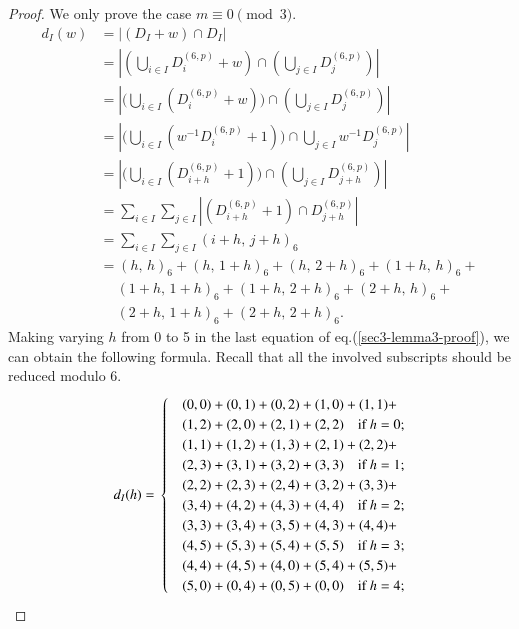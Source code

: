 \documentclass[letter]{ieice}
\begin{document}
 \begin{proof}
 We only prove the case $ m\equiv 0 \pmod 3 $.
 \begin{equation}\label{sec3-lemma3-proof}
 \begin{split}
  d_{I}(w)&=|( \mathit{D}_{I}+w)\cap  \mathit{D}_{I}|\\
   &=|(\bigcup_{i\in I}D_{i}^{(6,p)}+w)\cap (\bigcup_{j\in I}D_{j}^{(6,p)})|\\
   &=|\bigl(\bigcup_{i\in I}(D_{i}^{(6,p)}+w)\bigr)\cap (\bigcup_{j\in I}D_{j}^{(6,p)})|\\
   &=|\bigl(\bigcup_{i\in I}(w^{-1}D_{i}^{(6,p)}+1)\bigr)\cap \bigcup_{j\in I}w^{-1}D_{j}^{(6,p)}|\\
    &=|\bigl(\bigcup_{i\in I}(D_{i+h}^{(6,p)}+1)\bigr)\cap (\bigcup_{j\in I}D_{j+h}^{(6,p)})|\\
  &=\sum_{i\in I}\sum_{j\in I}|(D_{i+h}^{(6,p)}+1)\cap D_{j+h}^{(6,p)}|\\
  &=\sum_{i\in I}\sum_{j\in I}(i+h,\,j+h)_{6}\\
  &=(h,\,h)_{6}+(h,\,1+h)_{6}+(h,\,2+h)_{6}+(1+h,\,h)_{6}+\\
  &\ \quad (1+h,\,1+h)_{6}+(1+h,\,2+h)_{6}+(2+h,\,h)_{6}+\\
  &\ \quad (2+h,\,1+h)_{6}+(2+h,\,2+h)_{6}.
  \end{split}
 \end{equation}
Making varying $ h $ from 0 to 5 in the last equation of eq.(\ref{sec3-lemma3-proof}), we can obtain the following formula. Recall that all the involved subscripts should be reduced modulo 6.
\begin{equation}\label{sec3-lemma3-proof02}
 d_{I}(h)=\\
 \begin{cases}
&(0,0)+(0,1)+(0,2)+(1,0)+(1,1)+\\
&(1,2)+(2,0)+(2,1)+(2,2)\quad \mbox{if}\ h=0;\\
&(1,1)+(1,2)+(1,3)+(2,1)+(2,2)+\\
&(2,3)+(3,1)+(3,2)+(3,3)\quad \mbox{if}\ h=1;\\
&(2,2)+(2,3)+(2,4)+(3,2)+(3,3)+\\
&(3,4)+(4,2)+(4,3)+(4,4)\quad \mbox{if}\ h=2;\\
&(3,3)+(3,4)+(3,5)+(4,3)+(4,4)+\\
&(4,5)+(5,3)+(5,4)+(5,5)\quad \mbox{if}\ h=3;\\
&(4,4)+(4,5)+(4,0)+(5,4)+(5,5)+\\
&(5,0)+(0,4)+(0,5)+(0,0)\quad \mbox{if}\ h=4;\\

\end{cases}
\end{equation}
\end{proof}
\end{document}
